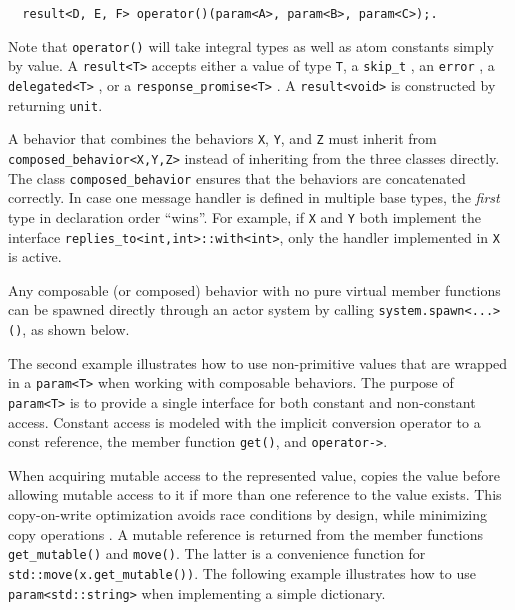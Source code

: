 \begin{lstlisting}
  result<D, E, F> operator()(param<A>, param<B>, param<C>);.
\end{lstlisting}

Note that \lstinline^operator()^ will take integral types as well as atom
constants simply by value. A \lstinline^result<T>^ accepts either a value of
type \lstinline^T^, a \lstinline^skip_t^ , an
\lstinline^error^ , a \lstinline^delegated<T>^ , or a
\lstinline^response_promise<T>^ . A \lstinline^result<void>^ is
constructed by returning \lstinline^unit^.

A behavior that combines the behaviors \lstinline^X^, \lstinline^Y^, and
\lstinline^Z^ must inherit from \lstinline^composed_behavior<X,Y,Z>^ instead of
inheriting from the three classes directly. The class
\lstinline^composed_behavior^ ensures that the behaviors are concatenated
correctly. In case one message handler is defined in multiple base types, the
\emph{first} type in declaration order ``wins''. For example, if \lstinline^X^
and \lstinline^Y^ both implement the interface
\lstinline^replies_to<int,int>::with<int>^, only the handler implemented in
\lstinline^X^ is active.

Any composable (or composed) behavior with no pure virtual member functions can
be spawned directly through an actor system by calling
\lstinline^system.spawn<...>()^, as shown below.


\clearpage

The second example illustrates how to use non-primitive values that are wrapped
in a \lstinline^param<T>^ when working with composable behaviors. The purpose
of \lstinline^param<T>^ is to provide a single interface for both constant and
non-constant access. Constant access is modeled with the implicit conversion
operator to a const reference, the member function \lstinline^get()^, and
\lstinline^operator->^.

When acquiring mutable access to the represented value, \lib copies the value
before allowing mutable access to it if more than one reference to the value
exists. This copy-on-write optimization avoids race conditions by design, while
minimizing copy operations . A mutable reference is returned
from the member functions \lstinline^get_mutable()^ and \lstinline^move()^. The
latter is a convenience function for \lstinline^std::move(x.get_mutable())^.
The following example illustrates how to use \lstinline^param<std::string>^
when implementing a simple dictionary.

